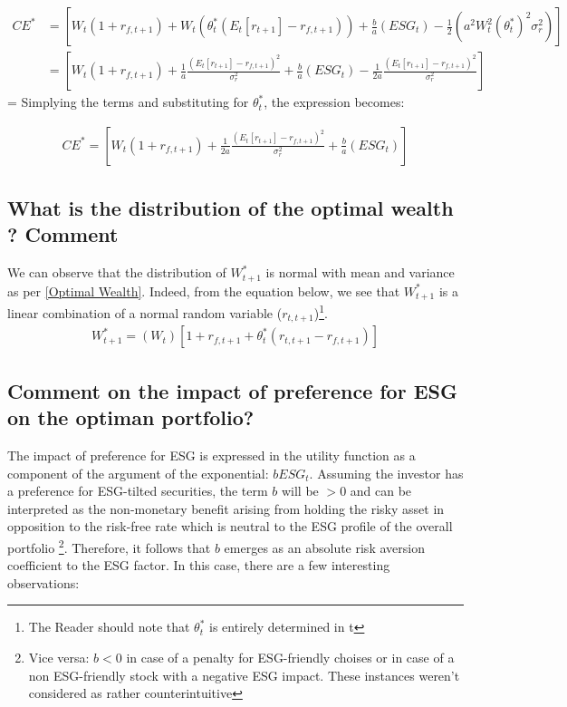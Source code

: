\documentclass[12pt]{article}
\begin{document}
	\begin{align*}
		CE^* &= [W_t(1 + r_{f,t+1}) + W_t(\theta_t^*(E_{t}[r_{t+1}]-r_{f, t+1})) + \frac{b}{a}(ESG_t) - \frac{1}{2}(a^2W_t^2(\theta_t^{*})^2\sigma_r^2)] \\
		&= [W_t(1 + r_{f,t+1}) + \frac{1}{a}\frac{(E_{t}[r_{t+1}]-r_{f, t+1})^2}{\sigma_r^2} + \frac{b}{a}(ESG_t) - \frac{1}{2a}\frac{(E_{t}[r_{t+1}]-r_{f, t+1})^2}{\sigma_r^2}]
	\end{align*} \vspace{-1em}
	= 
	Simplying the terms and substituting for $\theta_t^{*}$, the expression becomes: \vspace{-0.5em}
	
	\begin{align}
		CE^* = [W_t(1 + r_{f,t+1}) + \frac{1}{2a}\frac{(E_{t}[r_{t+1}]-r_{f, t+1})^2}{\sigma_r^2} + \frac{b}{a}(ESG_t)] 
	\end{align}
	
	\subsection{What is the distribution of the optimal wealth ? Comment}
	
	We can observe that the distribution of $W_{t+1}^{*}$ is normal with mean and variance as per \ref{Optimal Wealth}. Indeed, from the equation below, we see that $W_{t+1}^{*}$ is a linear combination of a normal random variable ($r_{t,t+1}$)\footnote {The Reader should note that $\theta_t^*$ is entirely determined in t}.
	\begin{align}
		W_{t+1}^{*} = (W_t) \left[1 + r_{f,t+1} + \theta_t^*(r_{t,t+1}-r_{f, t+1}) \right]
	\end{align}
	
	\subsection{Comment on the impact of preference for ESG on the optiman portfolio?}
	
	The impact of preference for ESG is expressed in the utility function as a component of the argument of the exponential: $bESG_t$. 
	Assuming the investor has a preference for ESG-tilted securities, the term $b$ will be $> 0$ and can be interpreted as the non-monetary benefit arising from holding the risky asset in opposition to the risk-free rate which is neutral to the ESG profile of the overall portfolio \footnote {Vice versa: $b < 0 $ in case of a penalty for ESG-friendly choises or in case of a non ESG-friendly stock with a negative ESG impact. These instances weren't considered as rather counterintuitive}. Therefore, it follows that $b$ emerges as an absolute risk aversion coefficient to the ESG factor.
	In this case, there are a few interesting observations: 
	
\end{document}
